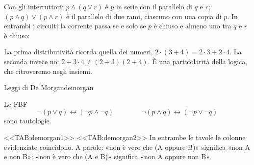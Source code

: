 \begin{spiegazione}
    Con gli interruttori: $p \wedge (q \vee r)$ è $p$ in serie con il parallelo di $q$ e $r$; $(p \wedge q) \vee (p \wedge r)$ è il parallelo di due rami, ciascuno con
    una copia di $p$. In entrambi i circuiti la corrente passa se e solo se $p$ è chiuso e almeno uno tra $q$ e $r$ è chiuso:
    \begin{center}
    \end{center}
    La prima distributività ricorda quella dei numeri, $2 \cdot (3 + 4) = 2 \cdot 3 + 2 \cdot 4$. La seconda invece no: $2 + 3 \cdot 4 \neq (2 + 3)(2 + 4)$. È una
    particolarità della logica, che ritroveremo negli insiemi.
\end{spiegazione}


\begin{concetto}
\begin{Proposizione}{Leggi di De Morgan}{demorgan}
    \begin{prerequisiti}
    \end{prerequisiti}
    Le FBF
    \[ \neg(p \vee q) \leftrightarrow (\neg p \wedge \neg q) \qquad\qquad \neg(p \wedge q) \leftrightarrow (\neg p \vee \neg q) \]
    sono tautologie.
\end{Proposizione}

\begin{dimostrazione}
    <<TAB:demorgan1>>
    <<TAB:demorgan2>>
    In entrambe le tavole le colonne evidenziate coincidono. A parole: «non è vero che (A oppure B)»
    significa «non A e non B»; «non è vero che (A e B)» significa «non A oppure non B».
\end{dimostrazione}
\end{concetto}


